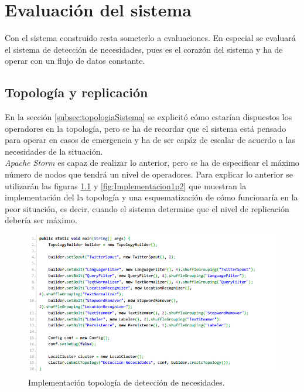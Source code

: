 \chapter{Evaluación del sistema}
\label{cap:experimentos}

Con el sistema construido resta someterlo a evaluaciones. En especial se evaluará el sistema de detección de necesidades, pues es el corazón del sistema y ha de operar con un flujo de datos constante.

\section{Topología y replicación}
\label{sec:topYPar}

En la sección \ref{subsec:topologiaSistema} se explicitó cómo estarían dispuestos los operadores en la topología, pero se ha de recordar que el sistema está pensado para operar en casos de emergencia y ha de ser capáz de escalar de acuerdo a las necesidades de la situación.\\

\textit{Apache Storm} es capaz de realizar lo anterior, pero se ha de especificar el máximo número de nodos que tendrá un nivel de operadores. Para explicar lo anterior se utilizarán las figuras \ref{fig:Implementacion1} y \ref{fig:Implementacion1p2} que muestran la implementación del la topología y una esquematización de cómo funcionaría en la peor situación, es decir, cuando el sistema determine que el nivel de replicación debería ser máximo.

\begin{figure}[H]
	\centering
	\captionsetup{justification=centering}
	\includegraphics[scale=0.8]{images/ImplementacionTopologia1.png}
	\caption[Implementación topología de detección de necesidades.]{Implementación topología de detección de necesidades.}
	\label{fig:Implementacion1}
\end{figure}

